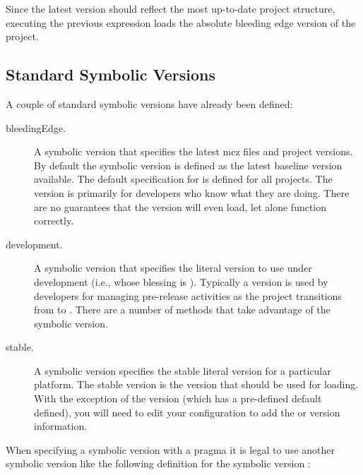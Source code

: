 \documentclass[a4paper,10pt,twoside]{book}
\begin{document}
Since the latest  version should reflect the most up-to-date project structure, executing the previous expression loads the absolute bleeding edge version of the project. 



\subsection{Standard Symbolic Versions}

A couple of standard symbolic versions have already been defined:

\begin{description}
\item [bleedingEdge.]  A symbolic version that specifies the latest mcz files and project versions. By default the  symbolic version is defined as the latest baseline version available. The default specification for  is defined for all projects. The  version is primarily for developers who know what they are doing. There are no guarantees that the  version will even load, let alone function correctly.

\item [development.] A symbolic version that specifies the literal version to use under development (i.e., whose blessing is ). Typically a  version is used by developers for managing pre-release activities as the project transitions from  to . There are a number of  methods that take advantage of the  symbolic version.

\item [stable.] A symbolic version specifies the stable literal version for a particular platform. The stable version is the version that should be used for loading.
With the exception of the  version (which has a pre-defined default defined), you will need to edit your configuration to add the  or  version information.
\end{description}



When specifying a symbolic version with a  pragma it is legal to use another symbolic version like the following definition for the symbolic version :
\end{document}
